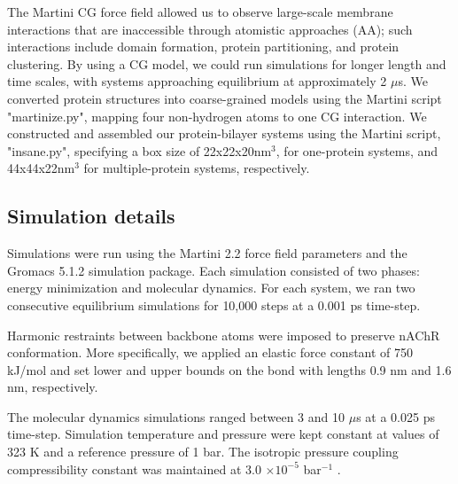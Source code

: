 \documentclass[final,3p,times,twocolumn]{elsarticle}
\begin{document}
The Martini CG force field allowed us to observe large-scale membrane interactions that are inaccessible through atomistic approaches (AA); such interactions include domain formation, protein partitioning, and protein clustering. By using a CG model, we could run simulations for longer length and time scales, with systems approaching equilibrium at approximately 2 $\mu$s.  \cite{Marrink2007}
We converted protein structures into coarse-grained models using the Martini script "martinize.py", mapping four non-hydrogen atoms to one CG interaction. We constructed and assembled our protein-bilayer systems using  the Martini script, "insane.py", specifying a box size of 22x22x20nm$^{3}$, for one-protein systems, and 44x44x22nm$^{3}$  for multiple-protein systems, respectively.  \cite{Marrink2007}
 






\subsection{Simulation details}
Simulations were run using the Martini 2.2 force field parameters and the Gromacs 5.1.2 simulation package.\cite{Marrink2007, Pronk2013} Each simulation consisted of two phases: energy minimization and molecular dynamics. For each system, we ran two consecutive equilibrium simulations for 10,000 steps at a 0.001 ps time-step.  


Harmonic restraints between backbone atoms were imposed to preserve nAChR conformation. More specifically, we applied an elastic force constant of 750 kJ/mol and set lower and upper bounds on the bond with lengths 0.9 nm and 1.6 nm, respectively\cite{Marrink2007, Pronk2013}.  

 
The molecular dynamics simulations ranged between 3 and 10 $\mu$s at a 0.025 ps time-step. Simulation temperature and pressure were kept constant at values of 323 K and a reference pressure of 1 bar. The isotropic pressure coupling compressibility constant was maintained at 3.0 $\times {10^{-5}}$ bar$^{-1}$ .




\end{document}
